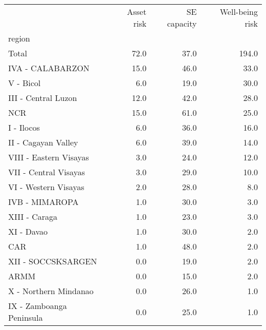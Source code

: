 \begin{tabular}{lrrr}
\toprule
{} &  Asset risk &  SE capacity &  Well-being risk \\
region                   &             &              &                  \\
\midrule
Total                    &        72.0 &         37.0 &            194.0 \\
IVA - CALABARZON         &        15.0 &         46.0 &             33.0 \\
V - Bicol                &         6.0 &         19.0 &             30.0 \\
III - Central Luzon      &        12.0 &         42.0 &             28.0 \\
NCR                      &        15.0 &         61.0 &             25.0 \\
I - Ilocos               &         6.0 &         36.0 &             16.0 \\
II - Cagayan Valley      &         6.0 &         39.0 &             14.0 \\
VIII - Eastern Visayas   &         3.0 &         24.0 &             12.0 \\
VII - Central Visayas    &         3.0 &         29.0 &             10.0 \\
VI - Western Visayas     &         2.0 &         28.0 &              8.0 \\
IVB - MIMAROPA           &         1.0 &         30.0 &              3.0 \\
XIII - Caraga            &         1.0 &         23.0 &              3.0 \\
XI - Davao               &         1.0 &         30.0 &              2.0 \\
CAR                      &         1.0 &         48.0 &              2.0 \\
XII - SOCCSKSARGEN       &         0.0 &         19.0 &              2.0 \\
ARMM                     &         0.0 &         15.0 &              2.0 \\
X - Northern Mindanao    &         0.0 &         26.0 &              1.0 \\
IX - Zamboanga Peninsula &         0.0 &         25.0 &              1.0 \\
\bottomrule
\end{tabular}

